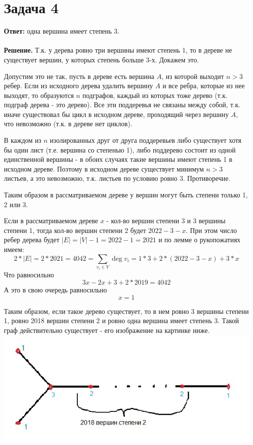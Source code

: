 \documentclass{article}
\begin{document}
\section*{Задача 4}
{\bf Ответ:} одна вершина имеет степень 3.
\\
\\
{\bf Решение.} Т.к. у дерева ровно три вершины имеют степень 1, то в дереве не существует вершин, у которых степень больше 3-х. Докажем это.
\par
Допустим это не так, пусть в дереве есть вершина $A$, из которой выходит $n>3$ ребер. Если из исходного дерева удалить вершину $A$ и все ребра, которые из нее выходят, то образуются $n$ подграфов, каждый из которых тоже дерево (т.к. подграф дерева - это дерево).  Все эти поддеревья не связаны между собой, т.к. иначе существовал бы цикл в исходном дереве, проходящий через вершину $A$, что невозможно (т.к. в дереве нет циклов). 
\par
В каждом из $n$ изолированных друг от друга поддеревьев либо существует хотя бы один лист (т.е. вершина со степенью 1), либо поддерево состоит из одной единственной вершины - в обоих случаях такие вершины имеют степень 1 в исходном дереве. Поэтому в исходном дереве существует минимум $n > 3$ листьев, а это невозможно, т.к. листьев по условию ровно 3. Противоречие. 
\par
Таким образом в рассматриваемом дереве у вершин могут быть степени только 1, 2 или 3.
\par
Если в рассматриваемом дереве $x$ - кол-во вершин степени $3$ и 3 вершины степени 1, тогда кол-во вершин степени 2 будет $2022-3-x$.  При этом число ребер дерева будет $|E|=|V|-1 = 2022 - 1 = 2021$  и по лемме о рукопожатиях имеем:
$$2*|E| = 2*2021 = 4042 = \sum_{v_i\in V}\deg{v_i}=1*3+2*(2022-3-x)+3*x$$
Что равносильно
$$3x - 2x + 3+2*2019 = 4042$$
А это в свою очередь равносильно
$$x = 1$$
\par
Таким образом, если такое дерево существует, то в нем ровно 3 вершины степени 1, ровно 2018 вершин степени 2 и ровно одна вершина имеет степень 3. Такой граф действительно существует - его изображение на картинке ниже.
\\
{\includegraphics[scale=0.6]{img/img3.jpg}}
\end{document}
